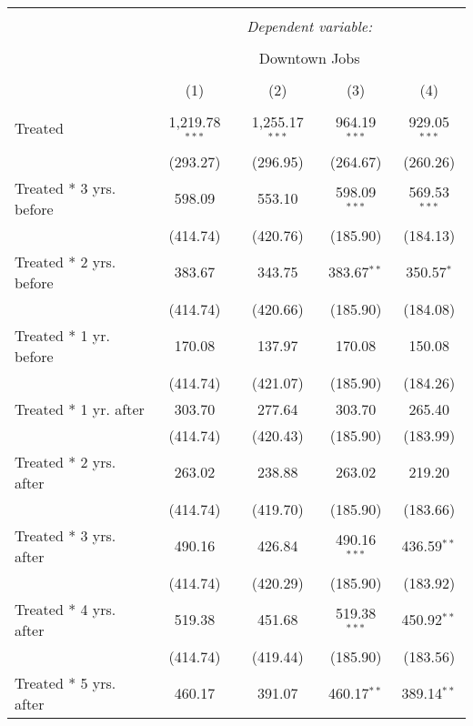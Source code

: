 
\begin{table}[!htbp] \centering 
  \caption{} 
  \label{} 
\tiny 
\begin{tabular}{@{\extracolsep{5pt}}lcccc} 
\\[-1.8ex]\hline 
\hline \\[-1.8ex] 
 & \multicolumn{4}{c}{\textit{Dependent variable:}} \\ 
\cline{2-5} 
\\[-1.8ex] & \multicolumn{4}{c}{Downtown Jobs} \\ 
\\[-1.8ex] & (1) & (2) & (3) & (4)\\ 
\hline \\[-1.8ex] 
 Treated & 1,219.78$^{***}$ & 1,255.17$^{***}$ & 964.19$^{***}$ & 929.05$^{***}$ \\ 
  & (293.27) & (296.95) & (264.67) & (260.26) \\ 
  Treated * 3 yrs. before & 598.09 & 553.10 & 598.09$^{***}$ & 569.53$^{***}$ \\ 
  & (414.74) & (420.76) & (185.90) & (184.13) \\ 
  Treated * 2 yrs. before & 383.67 & 343.75 & 383.67$^{**}$ & 350.57$^{*}$ \\ 
  & (414.74) & (420.66) & (185.90) & (184.08) \\ 
  Treated * 1 yr. before & 170.08 & 137.97 & 170.08 & 150.08 \\ 
  & (414.74) & (421.07) & (185.90) & (184.26) \\ 
  Treated * 1 yr. after & 303.70 & 277.64 & 303.70 & 265.40 \\ 
  & (414.74) & (420.43) & (185.90) & (183.99) \\ 
  Treated * 2 yrs. after & 263.02 & 238.88 & 263.02 & 219.20 \\ 
  & (414.74) & (419.70) & (185.90) & (183.66) \\ 
  Treated * 3 yrs. after & 490.16 & 426.84 & 490.16$^{***}$ & 436.59$^{**}$ \\ 
  & (414.74) & (420.29) & (185.90) & (183.92) \\ 
  Treated * 4 yrs. after & 519.38 & 451.68 & 519.38$^{***}$ & 450.92$^{**}$ \\ 
  & (414.74) & (419.44) & (185.90) & (183.56) \\ 
  Treated * 5 yrs. after & 460.17 & 391.07 & 460.17$^{**}$ & 389.14$^{**}$ \\ 

\end{tabular}
\end{table}
